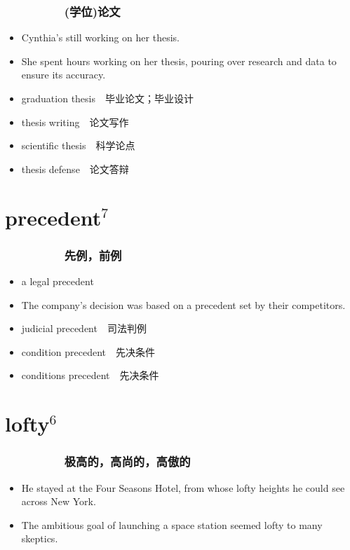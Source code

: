 \documentclass[UTF8,4pt,a3paper,space]{article}
\begin{document}
\begin{multicols}{4}
\subsubsection*{\ \ \ \ \ \ \ \ \ (学位)论文}\begin{itemize}
\itemsep-0.5em
    \item Cynthia’s still working on her thesis.    \item She spent hours working on her thesis, pouring over research and data to ensure its accuracy. 
\end{itemize}
\begin{itemize}
\itemsep-0.5em
   \item graduation thesis\ \ 毕业论文；毕业设计
   \item thesis writing\ \ 论文写作
   \item scientific thesis\ \ 科学论点
   \item thesis defense\ \ 论文答辩
\end{itemize}
\hrulefill


\section{precedent$^7$}
\subsubsection*{\ \ \ \ \ \ \ \ \ 先例，前例}\begin{itemize}
\itemsep-0.5em
    \item a legal precedent    \item The company's decision was based on a precedent set by their competitors. 
\end{itemize}
\begin{itemize}
\itemsep-0.5em
   \item judicial precedent\ \ 司法判例
   \item condition precedent\ \ 先决条件
   \item conditions precedent\ \ 先决条件
\end{itemize}
\hrulefill


\section{lofty$^6$}
\subsubsection*{\ \ \ \ \ \ \ \ \ 极高的，高尚的，高傲的}\begin{itemize}
\itemsep-0.5em
    \item He stayed at the Four Seasons Hotel, from whose lofty heights he could see across New York.    \item The ambitious goal of launching a space station seemed lofty to many skeptics. 
\end{itemize}
\hrulefill



\end{multicols}
\end{document}
